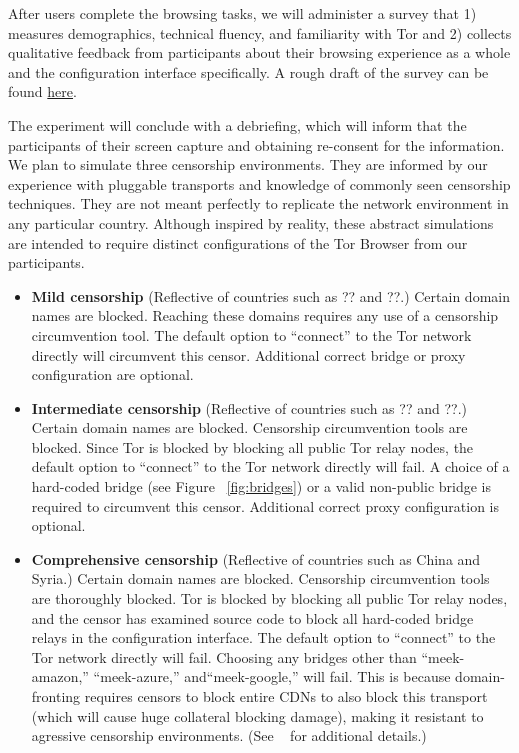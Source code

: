 \documentclass{template}
\begin{document}
After users complete the browsing tasks, we will administer a survey that 1)
measures demographics, technical fluency, and
familiarity with Tor and 2) collects qualitative feedback from
participants about their browsing experience as a whole
and the configuration interface specifically.
A rough draft of the survey can be
found
\href{http://www.surveygizmo.com/collab/2085559/Tor-Usability-Survey}{here}.

The experiment will conclude with a debriefing, which will inform that the
participants of their screen capture and obtaining re-consent for the
information.  \\

We plan to simulate three censorship environments.
They are informed by our experience with pluggable transports
and knowledge of commonly seen censorship techniques.
They are not meant perfectly to replicate the network environment
in any particular country. Although inspired by reality, these
abstract simulations are intended to require distinct configurations
of the Tor Browser from our participants. 

\begin{itemize} \itemsep1pt \parskip0pt 
\item {\bfseries Mild censorship} 
(Reflective of countries such as {\color{red}?? and ??}.)
Certain domain names are blocked. Reaching these 
domains requires any use of a censorship circumvention 
tool. The default option to ``connect'' to the Tor network 
directly will circumvent this censor. Additional correct
bridge or proxy configuration are optional. 
\item {\bfseries Intermediate censorship} 
(Reflective of countries such as {\color{red}?? and ??}.)
Certain domain names are blocked. Censorship circumvention
tools are blocked. Since Tor is blocked by blocking all public Tor
relay nodes, the default option to ``connect'' to the Tor network
directly will fail. A choice of a hard-coded bridge (see Figure ~\ref{fig:bridges})
or a valid non-public bridge is required to circumvent this censor.  
Additional correct proxy configuration is optional.
\item {\bfseries Comprehensive censorship} 
(Reflective of countries such as China and Syria.)
Certain domain names are blocked. Censorship circumvention tools
are thoroughly blocked. Tor is blocked by blocking all public
Tor relay nodes, and the censor has examined source code to block
all hard-coded bridge relays in the configuration interface. The default option
to ``connect'' to the Tor network directly will fail. Choosing any bridges other than
``meek-amazon,'' ``meek-azure,'' and``meek-google,'' will fail. This is because 
domain-fronting requires censors to block entire CDNs to also block this
transport (which will cause huge collateral blocking damage), making it resistant to agressive censorship environments.
(See ~\cite{fifield2015blocking} for additional details.)\\
\end{itemize}
\end{document}
